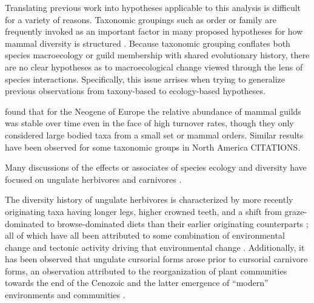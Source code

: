 \documentclass[12pt,letterpaper]{article}
\begin{document}
Translating previous work into hypotheses applicable to this analysis is difficult for a variety of reasons. Taxonomic groupings such as order or family are frequently invoked as an important factor in many proposed hypotheses for how mammal diversity is structured \citep{Quental2013,Slater2015c,Janis1993c,Pires2015a,Janis2008a}. Because taxonomic grouping conflates both species macroecology or guild membership with shared evolutionary history, there are no clear hypotheses as to macroecological change viewed through the lens of species interactions. Specifically, this issue arrises when trying to generalize previous observations from taxony-based to ecology-based hypotheses.

\citet{Jernvall2004} found that for the Neogene of Europe the relative abundance of mammal guilds was stable over time even in the face of high turnover rates, though they only considered large bodied taxa from a small set or mammal orders. Similar results have been observed for some taxonomic groups in North America CITATIONS.

Many discussions of the effects or associates of species ecology and diversity have focused on ungulate herbivores \citep{Janis2004,Janis2000,Janis1993c,Janis2008a} and carnivores \citep{Pires2015a,Slater2015c,Janis1993c,Silvestro2015b}.

The diversity history of ungulate herbivores is characterized by more recently originating taxa having longer legs, higher crowned teeth, and a shift from graze-dominated to browse-dominated diets than their earlier originating counterparts \citep{Janis2004,Janis2000,Janis1993c,Janis2008a}; all of which have all been attributed to some combination of environmental change and tectonic activity driving that environmental change \citep{Janis2008a,Eronen2015,Blois2009}. Additionally, it has been observed that ungulate cursorial forms arose prior to cursorial carnivore forms, an observation attributed to the reorganization of plant communities towards the end of the Cenozoic and the latter emergence of ``modern'' environments and communities \citep{Janis1993c}.
\end{document}
